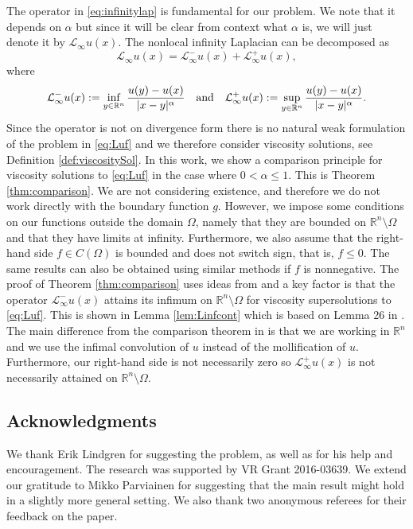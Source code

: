 \documentclass[11pt]{article}
\providecommand{\Lpos}{\mathcal{L}_{\infty}^+}
\providecommand{\Lneg}{\mathcal{L}_{\infty}^-}
\providecommand{\Rn}{\mathbb{R}^n}
\numberwithin{equation}{section}
\theoremstyle{definition}
\begin{document}
The operator in \eqref{eq:infinitylap} is fundamental for our problem. We note that it depends on $\alpha$ but since it will be clear from context what $\alpha$ is, we will just denote it by $\mathcal{L}_{\infty}u(x)$. The nonlocal infinity Laplacian can be decomposed as 
$$
\mathcal{L}_{\infty}u(x) = \Lneg u(x) + \Lpos u(x),
$$
where
\begin{align*}
  \mathcal{L}^-_{\infty}u(x):=  \inf_{y \in \Rn} \frac{u(y)-u(x)}{|x-y|^{\alpha}}
   \quad \textup{and} \quad \mathcal{L}^+_{\infty}u(x):=  \sup_{y \in \Rn} \frac{u(y)-u(x)}{|x-y|^{\alpha}}.
\end{align*}
Since the operator is not on divergence form there is no natural weak formulation of the problem in \eqref{eq:Luf} and we therefore consider viscosity solutions, see Definition \ref{def:viscositySol}. In this work, we show a comparison principle for viscosity solutions to \eqref{eq:Luf} in the case where $0 < \alpha \leq 1$. This is Theorem \ref{thm:comparison}. We are not considering existence, and therefore we do not work directly with the boundary function $g$. However, we impose some conditions on our functions outside the domain $\Omega$, namely that they are bounded on $\Rn \setminus \Omega$ and that they have limits at infinity. Furthermore, we also assume that the right-hand side $f\in C(\Omega)$ is bounded and does not switch sign, that is, $f \leq 0$. The same results can also be obtained using similar methods if $f$ is nonnegative. The proof of Theorem \ref{thm:comparison} uses ideas from \cite{CLM2012} and a key factor is that
the operator $ \mathcal{L}^-_{\infty}u(x)$ attains its infimum on $\Rn \setminus \Omega$ for viscosity supersolutions to \eqref{eq:Luf}. This is shown in Lemma \ref{lem:Linfcont} which is based on Lemma 26 in \cite{LL2012}. The main difference from the comparison theorem in \cite{CLM2012} is that we are working in $\Rn$ and we use the infimal convolution of $u$ instead of the mollification of $u$. Furthermore, our right-hand side is not necessarily zero so $\mathcal{L}^+_{\infty}u(x)$ is not necessarily attained on $\Rn \setminus \Omega$. 

\subsection*{Acknowledgments}
We thank Erik Lindgren for suggesting the problem, as well as for his help and encouragement. The research was supported by VR Grant 2016-03639. We extend our gratitude to Mikko Parviainen for suggesting that the main result might hold in a slightly more general setting. We also thank two anonymous referees for their feedback on the paper.
\end{document}
